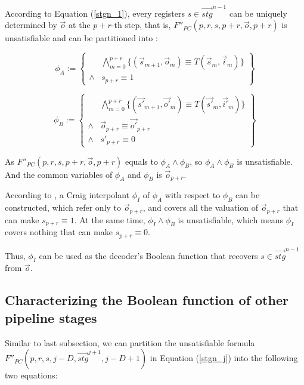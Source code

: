 \documentclass[runningheads,a4paper,orivec]{llncs}
\begin{document}
According to Equation (\ref{stgn_1}),
every registers $s\in \vec{stg}^{n-1}$ can be uniquely determined by $\vec{o}$ at the $p+r$-th step,
that is,
$F''_{PC}(p,r,s,p+r,\vec{o},p+r)$ is unsatisfiable and can be partitioned into :

\begin{equation}
 \phi_A := 
 \left\{
\begin{array}{cc}
&\bigwedge_{m=0}^{p+r}
\{
(\vec{s}_{m+1},\vec{o}_m)\equiv T(\vec{s}_m,\vec{i}_m)
\}
\\
\wedge& s_{p+r}\equiv 1 
\end{array}
\right\}
\end{equation}

\begin{equation}
\phi_B := 
\left\{
\begin{array}{cc}
&\bigwedge_{m=0}^{p+r}
\{
(\vec{s'}_{m+1},\vec{o'}_m)\equiv T(\vec{s'}_m,\vec{i'}_m)
\}
\\
\wedge&\vec{o}_{p+r}\equiv \vec{o'}_{p+r} \\
\wedge& s'_{p+r}\equiv 0 
\end{array}
\right\}
\end{equation}

As $F''_{PC}(p,r,s,p+r,\vec{o},p+r)$ equals to $\phi_A \wedge \phi_B$,
so $\phi_A \wedge \phi_B$ is unsatisfiable.
And the common variables of $\phi_A$ and $\phi_B$ is $\vec{o}_{p+r}$.

According to \cite{InterpBoolFunction},
a Craig interpolant $\phi_I$ of $\phi_A$ with respect to $\phi_B$ can be constructed,
which refer only to $\vec{o}_{p+r}$,
and covers all the valuation of $\vec{o}_{p+r}$ that can make $s_{p+r}\equiv 1$.
At the same time,
$\phi_I\wedge \phi_B$ is unsatisfiable,
which means $\phi_I$ covers nothing that can make $s_{p+r}\equiv 0$.

Thus,
$\phi_I$ can be used as the decoder's Boolean function that recovers $s\in \vec{stg}^{n-1}$ from $\vec{o}$.

\subsection{Characterizing the Boolean function of other pipeline stages}
Similar to last subsection,
we can partition the unsatisfiable formula $F''_{PC}(p,r,s,j-D,\vec{stg}^{j+1},j-D+1)$ 
in Equation (\ref{stgn_j}) into the following two equations:
\end{document}
